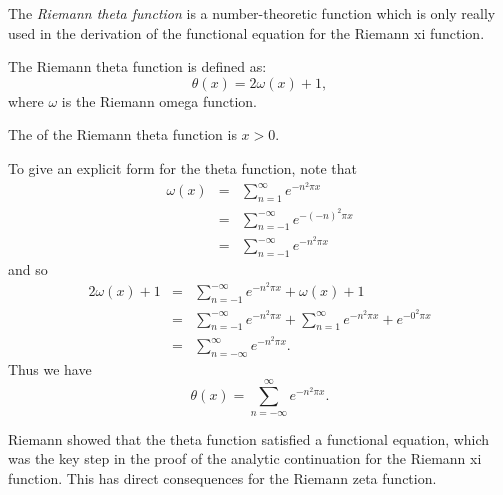 \documentclass[12pt]{article}
\begin{document}
The \emph{Riemann theta function} is a number-theoretic function
which is only really used in
the derivation of the functional equation for the Riemann xi function.
 
The Riemann theta function is defined as:
\[
  \theta(x) = 2\omega (x) + 1,
\]
where $\omega$ is the Riemann omega function.

The  of the Riemann theta function is $x > 0$.

To give an explicit form for the theta function, note that
\begin{eqnarray*}
\omega(x) &=& \sum_{n=1}^{\infty} e^{-n^2 \pi x}\\
          &=& \sum_{n=-1}^{-\infty} e^{-(-n)^2 \pi x}\\
          &=& \sum_{n=-1}^{-\infty} e^{-n^2 \pi x}
\end{eqnarray*}
and so
\begin{eqnarray*}
2\omega(x) + 1 &=& \sum_{n=-1}^{-\infty} e^{-n^2 \pi x} + \omega(x) + 1\\
               &=& \sum_{n=-1}^{-\infty} e^{-n^2 \pi x} + \sum_{n=1}^{\infty} e^{-n^2 \pi x} + e^{-0^2 \pi x}\\
               &=& \sum_{n=-\infty}^{\infty} e^{-n^2 \pi x}.
\end{eqnarray*}
Thus we have
\[
\theta(x) = \sum_{n=-\infty}^{\infty} e^{-n^2 \pi x}.
\]

Riemann showed that the theta function satisfied a functional equation,
which was the key step
in the proof of the analytic continuation for the Riemann xi function.
This has direct consequences for the Riemann zeta function.

\end{document}
